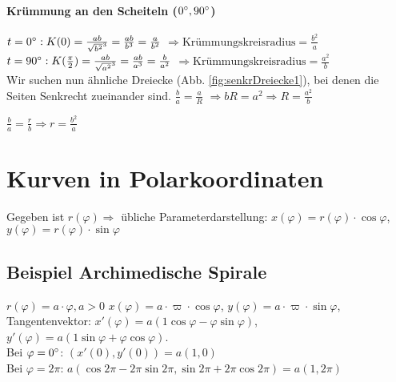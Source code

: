 \paragraph{Krümmung an den Scheiteln ($0^\circ, 90^\circ$)}
$t=0^\circ: K(0) = \frac{a b}{\sqrt{b^2}^3} = \frac{a b }{b^3} = \frac{a}{b^2}$ 
$\Rightarrow \textrm{Krümmungskreisradius} = \frac{b^2}{a}$\\

$t=90^\circ : K(\frac{\pi}{2}) = \frac{a b}{\sqrt{a^2}^3} = \frac{a b}{a^3} = \frac{b}{a^2}$ 
$\Rightarrow \textrm{Krümmungskreisradius} = \frac{a^2}{b}$\\

Wir suchen nun ähnliche Dreiecke (Abb. \ref{fig:senkrDreiecke1}), bei denen die Seiten Senkrecht zueinander sind. 
$\frac{b}{a} = \frac{a}{R}$
$\Rightarrow bR=a^2 \Rightarrow R = \frac{a^2}{b}$

$\frac{b}{a} = \frac{r}{b} \Rightarrow r=\frac{b^2}{a}$

\section{Kurven in Polarkoordinaten}
Gegeben ist $r(\varphi) \Rightarrow$ übliche Parameterdarstellung: 
$ x(\varphi) = r(\varphi) \cdot \cos \varphi$, 
$ y(\varphi) = r(\varphi) \cdot \sin \varphi$

\subsection{Beispiel Archimedische Spirale}
$ r(\varphi) = a \cdot \varphi, a > 0$
$ x(\varphi) = a \cdot \varpi \cdot \cos \varphi$, 
$ y(\varphi) = a \cdot \varpi \cdot \sin \varphi$,
Tangentenvektor: 
$x'(\varphi) = a(1\cos \varphi - \varphi \sin \varphi)$, 
$y'(\varphi) = a(1\sin \varphi + \varphi \cos \varphi)$. \\

Bei $\varphi = 0^\circ$: $(x'(0), y'(0)) = a(1,0)$\\
Bei $\varphi = 2\pi $: $a(\cos 2\pi - 2\pi \sin 2\pi, \sin 2\pi + 2\pi \cos 2\pi) = a(1,2\pi)$


